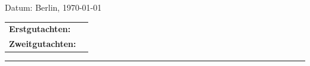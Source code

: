 \documentclass[conference]{IEEEtran}
\begin{document}
\begin{titlepage}
    \begin{center}
        {\Large Datum: Berlin, \today}
    \end{center}


\begin{center}
    \begin{tabular}{ll}
        {\bfseries\large Erstgutachten:} &  \\
        {\bfseries\large Zweitgutachten:} &  \\
    \end{tabular}
\end{center}


    \textcolor{HKS66}{\rule{\linewidth}{0.4mm}}

\end{titlepage}


\newpage
\end{document}
